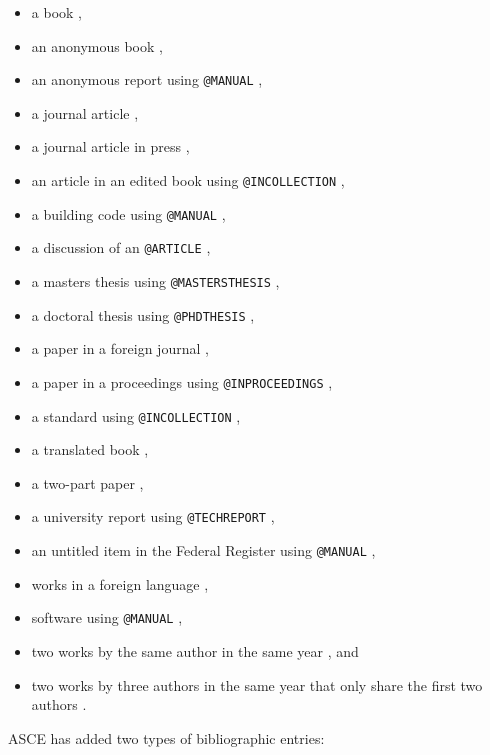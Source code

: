 \documentclass[Journal,letterpaper,NoLineNumbers]{ascelike-new}
\begin{document}
\begin{itemize}
\item a book \cite{Goossens:1994a},
\item an anonymous book \cite{Moody:1988a}, 
\item an anonymous report using \texttt{@MANUAL} \cite{FHWA:1991a}, 
\item a journal article \cite{Stahl:2004a,Pennoni:1992a}, 
\item a journal article in press \cite{Dasgupta:2008a},
\item an article in an edited book using \texttt{@INCOLLECTION} \cite{Zadeh:1981a}, 
\item a building code using \texttt{@MANUAL} \cite{ICBO:1988a}, 
\item a discussion of an \texttt{@ARTICLE} \cite{Vesilind:1992a}, 
\item a masters thesis using \texttt{@MASTERSTHESIS} \cite{Sotiropulos:1991a},
\item a doctoral thesis using \texttt{@PHDTHESIS} \cite{Chang:1987a}, 
\item a paper in a foreign journal \cite{Ireland:1954a}, 
\item a paper in a proceedings using \texttt{@INPROCEEDINGS} 
      \cite{Eshenaur:1991a,Garrett:2003a}, 
\item a standard using \texttt{@INCOLLECTION} \cite{ASTM:1991a}, 
\item a translated book \cite{Melan:1913a}, 
\item a two-part paper \cite{Frater:1992a,Frater:1992b}, 
\item a university report using \texttt{@TECHREPORT} \cite{Duan:1990a}, 
\item an untitled item in the Federal Register using 
      \texttt{@MANUAL} \cite{FR:1968a}, 
\item works in a foreign language \cite{Duvant:1972a,Reiffenstuhl:1982a},
\item software using \texttt{@MANUAL} \cite{Lotus:1985a},
\item two works by the same author in the same year
      \cite{Gaspar:2001b,Gaspar:2001a}, and
\item two works by three authors in the same year that only share
      the first two authors \cite{Huang2009a,Huang2009b}.
\end{itemize}
%
\par
ASCE has added two types of bibliographic entries:
\end{document}
